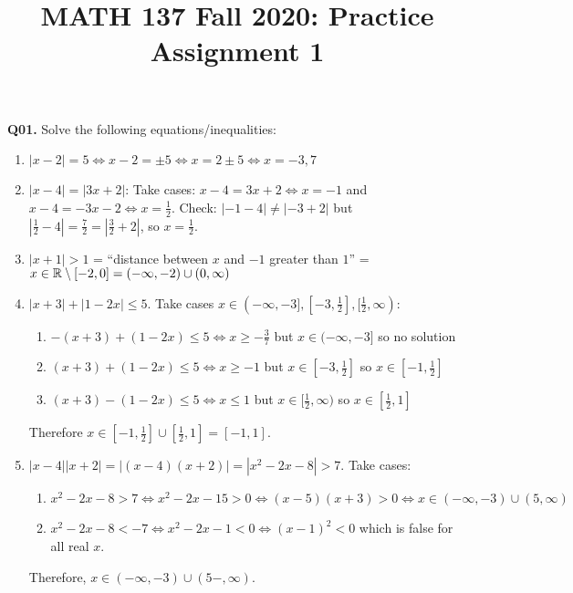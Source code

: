 \documentclass[11pt]{article}
\title{MATH 137 Fall 2020: Practice Assignment 1}
\begin{document}
\parindent=0pt
\thispagestyle{firstpage}

\textbf{\@title}

\textbf{Q01.} Solve the following equations/inequalities:
\begin{enumerate}
  \item $|x-2|=5\iff x-2=\pm5\iff x=2\pm5\iff x=-3,7$
  \item $|x-4|=|3x+2|$: Take cases: $x-4=3x+2\iff x=-1$ and $x-4=-3x-2\iff x=\frac12$.
        Check: $|-1-4|\neq|-3+2|$ but $|\frac12-4|=\frac72=|\frac32+2|$, so $x=\frac12$.
  \item $|x+1|>1$ = ``distance between $x$ and $-1$ greater than $1$'' = $x\in\mathbb{R}\setminus[-2,0]=(-\infty,-2)\cup(0,\infty)$
  \item $|x+3|+|1-2x|\leq5$. Take cases $x\in(-\infty,-3],[-3,\frac12],[\frac12,\infty)$:
        \begin{enumerate}[1.]
          \item $-(x+3)+(1-2x)\leq5\iff x\geq-\frac37$ but $x\in(-\infty,-3]$ so no solution
          \item $(x+3)+(1-2x)\leq5\iff x\geq-1$ but $x\in[-3,\frac12]$ so $x\in[-1,\frac12]$
          \item $(x+3)-(1-2x)\leq5\iff x\leq1$ but $x\in[\frac12,\infty)$ so $x\in[\frac12,1]$
        \end{enumerate}
        Therefore $x\in[-1,\frac12]\cup[\frac12,1]=[-1,1]$.
  \item $|x-4||x+2|=|(x-4)(x+2)|=|x^2-2x-8|>7$. Take cases:
        \begin{enumerate}[1.]
          \item $x^2-2x-8>7\iff x^2-2x-15>0\iff(x-5)(x+3)>0\iff x\in(-\infty,-3)\cup(5,\infty)$
          \item $x^2-2x-8<-7\iff x^2-2x-1<0\iff (x-1)^2<0$ which is false for all  real $x$.
        \end{enumerate}
        Therefore, $x\in(-\infty,-3)\cup(5-,\infty)$.
\end{enumerate}
\end{document}
